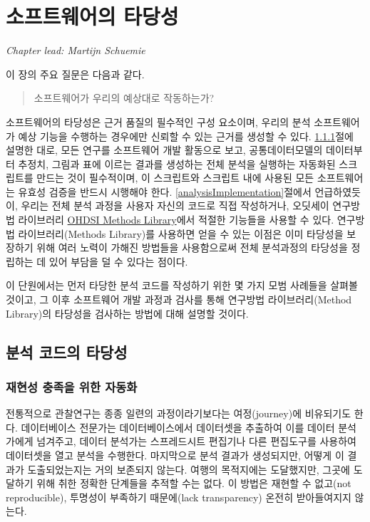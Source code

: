 \documentclass[11pt]{book}
\theoremstyle{definition}
\theoremstyle{definition}
\theoremstyle{definition}
\theoremstyle{remark}
\begin{document}
\chapter{소프트웨어의 타당성}\label{SoftwareValidity}

\emph{Chapter lead: Martijn Schuemie}

이 장의 주요 질문은 다음과 같다.

\begin{quote}
소프트웨어가 우리의 예상대로 작동하는가?
\end{quote}

소프트웨어의 타당성은 근거 품질의 필수적인 구성 요소이며, 우리의 분석
소프트웨어가 예상 기능을 수행하는 경우에만 신뢰할 수 있는 근거를 생성할
수 있다. \ref{automation}절에 설명한 대로, 모든 연구를 소프트웨어 개발
활동으로 보고, 공통데이터모델의 데이터부터 추정치, 그림과 표에 이르는
결과를 생성하는 전체 분석을 실행하는 자동화된 스크립트를 만드는 것이
필수적이며, 이 스크립트와 스크립트 내에 사용된 모든 소프트웨어는 유효성
검증을 반드시 시행해야 한다. \ref{analysisImplementation}절에서
언급하였듯이, 우리는 전체 분석 과정을 사용자 자신의 코드로 직접
작성하거나, 오딧세이 연구방법 라이브러리
\href{https://ohdsi.github.io/MethodsLibrary/}{OHDSI Methods
Library}에서 적절한 기능들을 사용할 수 있다. 연구방법 라이브러리(Methods
Library)를 사용하면 얻을 수 있는 이점은 이미 타당성을 보장하기 위해 여러
노력이 가해진 방법들을 사용함으로써 전체 분석과정의 타당성을 정립하는 데
있어 부담을 덜 수 있다는 점이다. 

이 단원에서는 먼저 타당한 분석 코드를 작성하기 위한 몇 가지 모범
사례들을 살펴볼 것이고, 그 이후 소프트웨어 개발 과정과 검사를 통해
연구방법 라이브러리(Method Library)의 타당성을 검사하는 방법에 대해
설명할 것이다. 

\section{분석 코드의 타당성}\label{--}

\subsection{재현성 충족을 위한 자동화}\label{automation}

전통적으로 관찰연구는 종종 일련의 과정이라기보다는 여정(journey)에
비유되기도 한다. 데이터베이스 전문가는 데이터베이스에서 데이터셋을
추출하여 이를 데이터 분석가에게 넘겨주고, 데이터 분석가는 스프레드시트
편집기나 다른 편집도구를 사용하여 데이터셋을 열고 분석을 수행한다.
마지막으로 분석 결과가 생성되지만, 어떻게 이 결과가 도출되었는지는 거의
보존되지 않는다. 여행의 목적지에는 도달했지만, 그곳에 도달하기 위해 취한
정확한 단계들을 추적할 수는 없다. 이 방법은 재현할 수 없고(not
reproducible), 투명성이 부족하기 때문에(lack transparency) 온전히
받아들여지지 않는다. 
\end{document}
